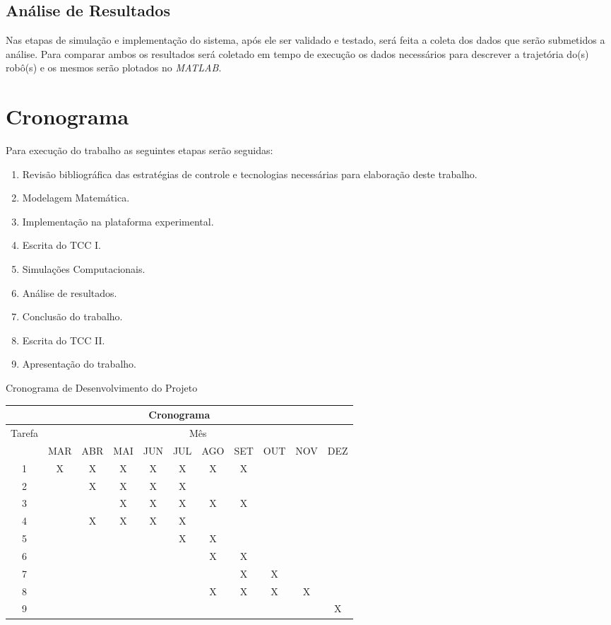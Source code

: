 \section{Análise de Resultados}

Nas etapas de simulação e implementação do sistema, após ele ser validado e testado, será feita a coleta dos dados que serão submetidos a análise. Para comparar ambos os resultados será coletado em tempo de execução os dados necessários para descrever a trajetória do(s) robô(s) e os mesmos serão plotados no \emph{MATLAB\textregistered}.

\chapter{Cronograma}

Para execução do trabalho as seguintes etapas serão seguidas:

\begin{enumerate}
	\item Revisão bibliográfica das estratégias de controle e tecnologias 
	necessárias para elaboração deste trabalho.
	\item Modelagem Matemática.
	\item Implementação na plataforma experimental.
	\item Escrita do TCC I.
	\item Simulações Computacionais.
	\item Análise de resultados.
	\item Conclusão do trabalho.
	\item Escrita do TCC II.
	\item Apresentação do trabalho.
\end{enumerate}

\begin{quadro}[!htb]
	\centering
	\caption{Cronograma de Desenvolvimento do Projeto\label{qua:cronograma}}
	\begin{tabular}{|c|cccccccccc|}
		\hline
		\multicolumn{11}{|c|}{\textbf{Cronograma}} \\
		\hline
		\multirow{2}{*}{Tarefa} & \multicolumn{10}{c|}{Mês} \\ \cline{2-11}
		& MAR & ABR & MAI & JUN & JUL & AGO & SET & OUT & NOV & DEZ \\
		\hline
		1 & X & X & X & X & X & X & X &&& \\
		2 & & X & X & X & X &&&&& \\
		3 &&& X & X & X & X & X &&& \\
		4 & & X & X & X & X &&&&& \\
		5 & & & & & X & X &&&& \\
		6 & & & & & & X & X &&& \\
		7 & & & & & & & X & X && \\
		8 & & & & & & X & X & X & X & \\
		9 &&&&&&&&&& X \\
		\hline
	\end{tabular}
\end{quadro}

